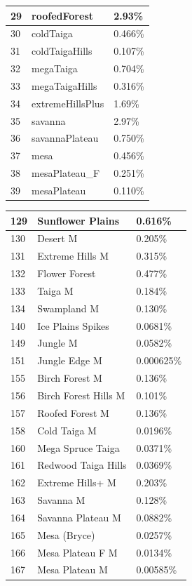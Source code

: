 \documentclass{article}
\begin{document}
\begin{tabular}{|l|l|l|}
		29     & roofedForest        & 2.93\%\\\hline
		30     & coldTaiga           & 0.466\%\\\hline
		31     & coldTaigaHills      & 0.107\%\\\hline
		32     & megaTaiga           & 0.704\%\\\hline
		33     & megaTaigaHills      & 0.316\%\\\hline
		34     & extremeHillsPlus    & 1.69\%\\\hline
		35     & savanna             & 2.97\%\\\hline
		36     & savannaPlateau      & 0.750\%\\\hline
		37     & mesa                & 0.456\%\\\hline
		38     & mesaPlateau\_F      & 0.251\%\\\hline
		39     & mesaPlateau         & 0.110\%\\\hline
	\end{tabular}
	\newpage\noindent
	\begin{tabular}{|l|l|l|}\hline
		129    & Sunflower Plains     & 0.616\%\\\hline
		130    & Desert M             & 0.205\%\\\hline
		131    & Extreme Hills M      & 0.315\%\\\hline
		132    & Flower Forest        & 0.477\%\\\hline
		133    & Taiga M              & 0.184\%\\\hline
		134    & Swampland M          & 0.130\%\\\hline
		140    & Ice Plains Spikes    & 0.0681\%\\\hline
		149    & Jungle M             & 0.0582\%\\\hline
		151    & Jungle Edge M        & 0.000625\%\\\hline
		155    & Birch Forest M       & 0.136\%\\\hline
		156    & Birch Forest Hills M & 0.101\%\\\hline
		157    & Roofed Forest M      & 0.136\%\\\hline
		158    & Cold Taiga M         & 0.0196\%\\\hline
		160    & Mega Spruce Taiga    & 0.0371\%\\\hline
		161    & Redwood Taiga Hills  & 0.0369\%\\\hline
		162    & Extreme Hills+ M     & 0.203\%\\\hline
		163    & Savanna M            & 0.128\%\\\hline
		164    & Savanna Plateau M    & 0.0882\%\\\hline
		165    & Mesa (Bryce)         & 0.0257\%\\\hline
		166    & Mesa Plateau F M     & 0.0134\%\\\hline
		167    & Mesa Plateau M       & 0.00585\%\\\hline
	\end{tabular}
\end{document}
